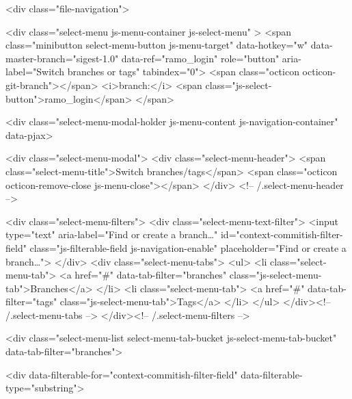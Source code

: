 <div class="file-navigation">
  
  

<div class="select-menu js-menu-container js-select-menu" >
  <span class="minibutton select-menu-button js-menu-target" data-hotkey="w"
    data-master-branch="sigest-1.0"
    data-ref="ramo_login"
    role="button" aria-label="Switch branches or tags" tabindex="0">
    <span class="octicon octicon-git-branch"></span>
    <i>branch:</i>
    <span class="js-select-button">ramo_login</span>
  </span>

  <div class="select-menu-modal-holder js-menu-content js-navigation-container" data-pjax>

    <div class="select-menu-modal">
      <div class="select-menu-header">
        <span class="select-menu-title">Switch branches/tags</span>
        <span class="octicon octicon-remove-close js-menu-close"></span>
      </div> <!-- /.select-menu-header -->

      <div class="select-menu-filters">
        <div class="select-menu-text-filter">
          <input type="text" aria-label="Find or create a branch…" id="context-commitish-filter-field" class="js-filterable-field js-navigation-enable" placeholder="Find or create a branch…">
        </div>
        <div class="select-menu-tabs">
          <ul>
            <li class="select-menu-tab">
              <a href="#" data-tab-filter="branches" class="js-select-menu-tab">Branches</a>
            </li>
            <li class="select-menu-tab">
              <a href="#" data-tab-filter="tags" class="js-select-menu-tab">Tags</a>
            </li>
          </ul>
        </div><!-- /.select-menu-tabs -->
      </div><!-- /.select-menu-filters -->

      <div class="select-menu-list select-menu-tab-bucket js-select-menu-tab-bucket" data-tab-filter="branches">

        <div data-filterable-for="context-commitish-filter-field" data-filterable-type="substring">


